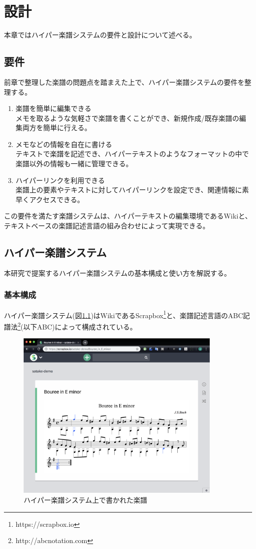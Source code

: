 \chapter{設計}
\label{chap:sekkei}

本章ではハイパー楽譜システムの要件と設計について述べる。

\newpage

\section{要件}
前章で整理した楽譜の問題点を踏まえた上で、ハイパー楽譜システムの要件を整理する。
\begin{enumerate}
    \item 楽譜を簡単に編集できる\\
    メモを取るような気軽さで楽譜を書くことができ、新規作成/既存楽譜の編集両方を簡単に行える。
    \item メモなどの情報を自在に書ける\\
    テキストで楽譜を記述でき、ハイパーテキストのようなフォーマットの中で楽譜以外の情報も一緒に管理できる。
    \item ハイパーリンクを利用できる\\
    楽譜上の要素やテキストに対してハイパーリンクを設定でき、関連情報に素早くアクセスできる。
\end{enumerate}
この要件を満たす楽譜システムは、ハイパーテキストの編集環境であるWikiと、テキストベースの楽譜記述言語の組み合わせによって実現できる。

\section{ハイパー楽譜システム}
本研究で提案するハイパー楽譜システムの基本構成と使い方を解説する。

\subsection{基本構成}
ハイパー楽譜システム(図\ref{hs})はWikiであるScrapbox\footnote{\textsf{https://scrapbox.io}}と、楽譜記述言語のABC記譜法\footnote{\textsf{http://abcnotation.com}}(以下ABC)によって構成されている。

\begin{figure}[H]
    \centering
    \includegraphics[width=10cm]{images/hyperscore.png}
    \caption{ハイパー楽譜システム上で書かれた楽譜}
    \label{hs}
\end{figure}


